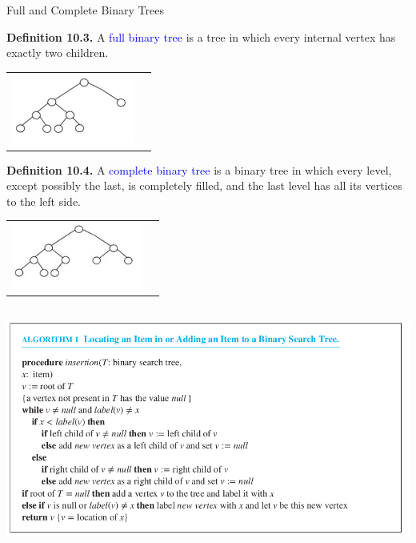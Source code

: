 \documentclass[aspectratio=169]{beamer}
\providecommand{\Blue}[1]{\textcolor{blue}{#1}}
\begin{document}
 
 \begin{frame}[plain]{Full and Complete Binary Trees}
 
 {\bf Definition 10.3.}  A \Blue{full binary tree}  is a  tree  in which every internal vertex
 has exactly two children. 
 \begin{center}
 \begin{tabular}{cc}
   \includegraphics[height=2.3cm]{./img/lecture10-fig3.png}
   \end{tabular}
 \end{center}

 
 {\bf Definition 10.4.} A \Blue{complete binary tree}  is a binary tree in which every level, except possibly 
  the last,  is completely filled,  and the last level has all its vertices to the left side.
  
 \begin{center}
 \begin{tabular}{cc}
   \includegraphics[height=2.2cm]{./img/lecture10-fig4.jpg}
   \end{tabular}
 \end{center}
  
 \end{frame}
 
 \begin{frame}[plain]{}
 
 \begin{center}
   \includegraphics[height=8cm]{./img/lecture10-fig5.png}
 \end{center}

 \end{frame}
 
\end{document}
